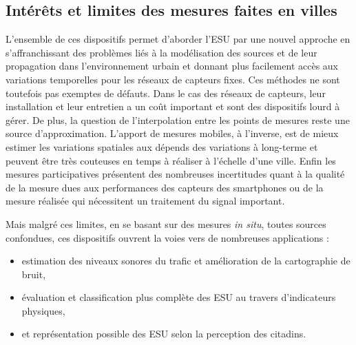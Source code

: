 \subsection{Intérêts et limites des mesures faites en villes}

L'ensemble de ces dispositifs permet d'aborder l'ESU par une nouvel approche en s'affranchissant des problèmes liés à la modélisation des sources et de leur propagation dans l'environnement urbain et donnant plus facilement accès aux variations temporelles pour les réseaux de capteurs fixes. Ces méthodes ne sont toutefois pas exemptes de défauts.
Dans le cas des réseaux de capteurs, leur installation et leur entretien a un coût important et sont des dispositifs lourd à gérer. De plus, la question de l'interpolation entre les points de mesures reste une source d'approximation.
L'apport de mesures mobiles, à l'inverse, est de mieux estimer les variations spatiales aux dépends des variations à long-terme et peuvent être très couteuses en temps à réaliser à l'échelle d'une ville. Enfin les mesures participatives présentent des nombreuses incertitudes quant à la qualité de la mesure dues aux performances des capteurs des smartphones ou de la mesure réalisée qui nécessitent un traitement du signal important.

Mais malgré ces limites, en se basant sur des mesures \textit{in situ}, toutes sources confondues, ces dispositifs ouvrent la voies vers de nombreuses applications :

\begin{itemize}
\item estimation des niveaux sonores du trafic et amélioration de la cartographie de bruit,
\item évaluation et classification plus complète des ESU au travers d'indicateurs physiques,
\item et représentation possible des ESU selon la perception des citadins.
\end{itemize}

